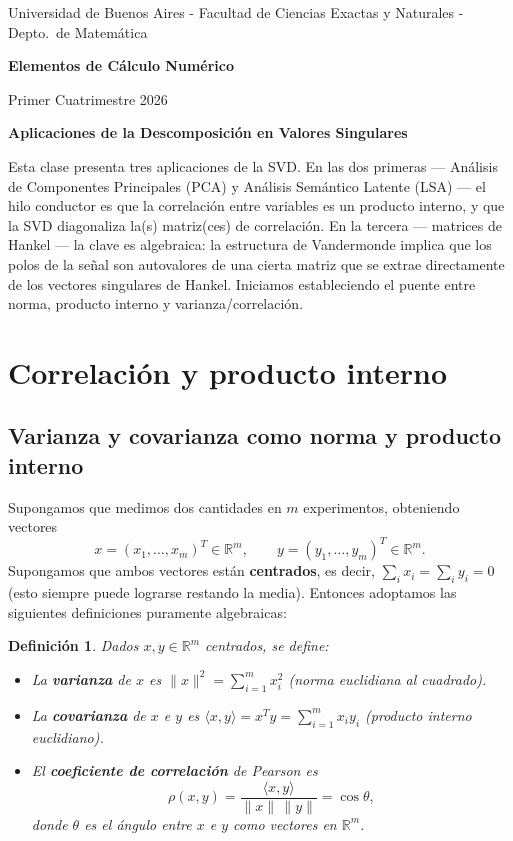 \documentclass[12pt]{article}
\newtheorem{definition}[theorem]{Definición}
\newcommand{\R}{\mathbb{R}}
\begin{document}
\centerline{{\small Universidad de Buenos Aires - Facultad de Ciencias Exactas y Naturales - Depto.\ de Matemática}}

\vskip 0.2cm
\hrulefill
\vskip 0.2cm

\centerline{{\bf\Huge {\sc Elementos de Cálculo Numérico}}}
\vskip 0.2cm
\centerline{\ttfamily Primer Cuatrimestre 2026}
\hrulefill

\bigskip
\centerline{\bf Aplicaciones de la Descomposición en Valores Singulares}
\bigskip

\noindent Esta clase presenta tres aplicaciones de la SVD. En las dos primeras --- Análisis de Componentes Principales (PCA) y Análisis Semántico Latente (LSA) --- el hilo conductor es que la correlación entre variables es un producto interno, y que la SVD diagonaliza la(s) matriz(ces) de correlación. En la tercera --- matrices de Hankel --- la clave es algebraica: la estructura de Vandermonde implica que los polos de la señal son autovalores de una cierta matriz que se extrae directamente de los vectores singulares de Hankel. Iniciamos estableciendo el puente entre norma, producto interno y varianza/correlación.

\section{Correlación y producto interno}

\subsection{Varianza y covarianza como norma y producto interno}

Supongamos que medimos dos cantidades en $m$ experimentos, obteniendo vectores
\[
  x = (x_1, \ldots, x_m)^T \in \R^m, \qquad y = (y_1, \ldots, y_m)^T \in \R^m.
\]
Supongamos que ambos vectores están \textbf{centrados}, es decir, $\sum_i x_i = \sum_i y_i = 0$ (esto siempre puede lograrse restando la media). Entonces adoptamos las siguientes definiciones puramente algebraicas:

\begin{definition}
Dados $x, y \in \R^m$ centrados, se define:
\begin{itemize}
  \item La \textbf{varianza} de $x$ es $\|x\|^2 = \sum_{i=1}^m x_i^2$ (norma euclidiana al cuadrado).
  \item La \textbf{covarianza} de $x$ e $y$ es $\langle x, y \rangle = x^T y = \sum_{i=1}^m x_i y_i$ (producto interno euclidiano).
  \item El \textbf{coeficiente de correlación} de Pearson es
  \[
    \rho(x, y) = \frac{\langle x, y \rangle}{\|x\|\,\|y\|} = \cos\theta,
  \]
  donde $\theta$ es el ángulo entre $x$ e $y$ como vectores en $\R^m$.
\end{itemize}
\end{definition}
\end{document}
